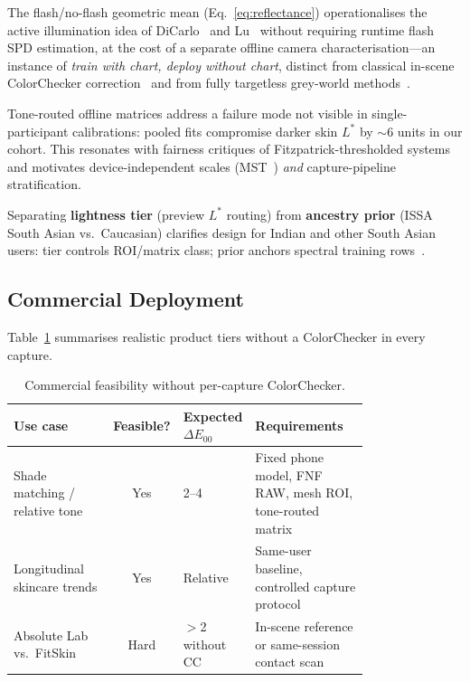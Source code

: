 \documentclass[11pt]{article}
\newcommand{\deee}{\ensuremath{\Delta E_{00}}}
\begin{document}
The flash/no-flash geometric mean (Eq.~\ref{eq:reflectance}) operationalises the active illumination idea of DiCarlo~\cite{dicarlo2001illuminating} and Lu~\cite{lu2006practical} without requiring runtime flash SPD estimation, at the cost of a separate offline camera characterisation---an instance of \emph{train with chart, deploy without chart}, distinct from classical in-scene ColorChecker correction~\cite{wakholi2026systematic} and from fully targetless grey-world methods~\cite{gijsenij2011}.

Tone-routed offline matrices address a failure mode not visible in single-participant calibrations: pooled fits compromise darker skin $L^*$ by ${\sim}6$ units in our cohort.
This resonates with fairness critiques of Fitzpatrick-thresholded systems~\cite{cook2025colorimetric} and motivates device-independent scales (MST~\cite{cheng2024monastic}) \emph{and} capture-pipeline stratification.

Separating \textbf{lightness tier} (preview $L^*$ routing) from \textbf{ancestry prior} (ISSA South Asian vs.\ Caucasian) clarifies design for Indian and other South Asian users: tier controls ROI/matrix class; prior anchors spectral training rows~\cite{issa2025,zhou2025scr,wang2025perform}.

\subsection{Commercial Deployment}

Table~\ref{tab:commercial} summarises realistic product tiers without a ColorChecker in every capture.

\begin{table}[htbp]
\centering
\caption{Commercial feasibility without per-capture ColorChecker.}
\label{tab:commercial}
\small
\begin{tabular}{p{0.28\linewidth} c p{0.18\linewidth} p{0.32\linewidth}}
\toprule
{Use case} & {Feasible?} & {Expected $\deee$} & {Requirements} \\
\midrule
Shade matching / relative tone & Yes & 2--4 & Fixed phone model, FNF RAW, mesh ROI, tone-routed matrix \\
Longitudinal skincare trends   & Yes & Relative & Same-user baseline, controlled capture protocol \\
Absolute Lab vs.\ FitSkin      & Hard & $>$2 without CC & In-scene reference or same-session contact scan \\
\bottomrule
\end{tabular}
\end{table}
\end{document}
